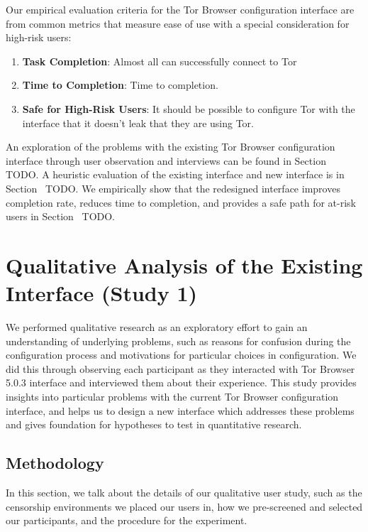 \documentclass[USenglish,oneside,twocolumn]{article}
\begin{document}
Our empirical evaluation criteria for the Tor Browser configuration
interface are from common metrics that measure ease of use with a special 
consideration for high-risk users: \\

\begin{enumerate}
    \item {\bfseries Task Completion}: Almost all can successfully connect to Tor
    \item {\bfseries  Time to Completion}: Time to completion. 
    \item {\bfseries Safe for High-Risk Users}: It should be possible to configure Tor with the interface that it doesn't leak that they are using Tor. 
\end{enumerate}

An exploration of the problems with the existing Tor Browser 
configuration interface through user observation and interviews can be 
found in Section~{\color{red} TODO}. A heuristic evaluation of the existing interface and new interface is in Section~{\color{red} TODO}. We empirically show 
that the redesigned interface improves completion rate, reduces time to completion, 
and provides a safe path for at-risk users in Section~{\color{red} TODO}. 

\section{Qualitative Analysis of the Existing Interface (Study 1)}
We performed qualitative research as an exploratory effort to gain an 
understanding of underlying problems, such as reasons for confusion 
during the configuration process and motivations for particular choices in 
configuration. We did this through observing each participant as they 
interacted with Tor Browser 5.0.3 interface and interviewed them about
their experience. This study provides insights into particular problems with 
the current Tor Browser configuration interface, and helps us to design
a new interface which addresses these problems and gives foundation
for hypotheses to test in quantitative research. 

\subsection{Methodology} 
In this section, we talk about the details of our qualitative user study, such as the censorship environments we placed our users in, how we pre-screened and selected our participants, and the procedure for the experiment. 
\end{document}

